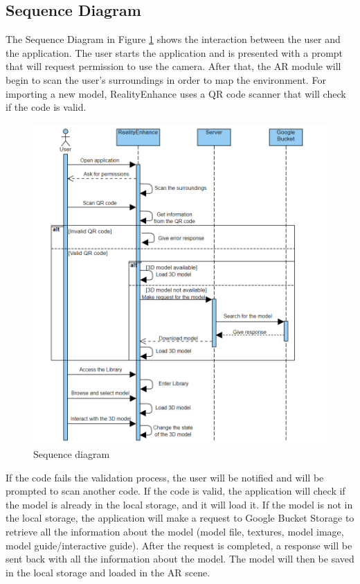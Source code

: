 \subsection*{Sequence Diagram}
The Sequence Diagram in Figure \ref{fig:SequenceDiagram} shows the interaction between the user and the application. The user starts the application and is presented with a prompt that will request permission to use the camera. After that, the \ac{AR} module will begin to scan the user's surroundings in order to map the environment. For importing a new model, RealityEnhance uses a \ac{QR} code scanner that will check if the code is valid.
\begin{figure}[ht]
    \centering
    \includegraphics[width=1\textwidth]{img/SequenceDiagram.png}
    \caption{Sequence diagram}
    \label{fig:SequenceDiagram}
\end{figure}

If the code fails the validation process, the user will be notified and will be prompted to scan another code. If the code is valid, the application will check if the model is already in the local storage, and it will load it. If the model is not in the local storage, the application will make a request to Google Bucket Storage to retrieve all the information about the model (model file, textures, model image, model guide/interactive guide). After the request is completed, a response will be sent back with all the information about the model. The model will then be saved in the local storage and loaded in the \ac{AR} scene.

